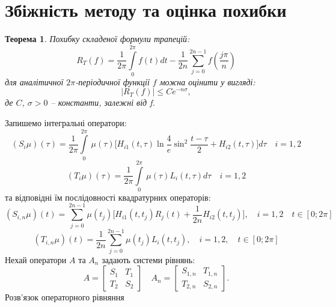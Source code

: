 \documentclass[a4 paper,12pt,ukrainian]{report}
\newtheorem{theorem}{\textbf{Теорема}}[chapter]
\begin{document}
\section*{Збіжність методу та оцінка похибки}
\begin{theorem}
Похибку складеної формули трапецій:
\begin{equation*}
R_{T}(f)=\frac{1}{2\pi}\int\limits_{0}^{2\pi}f(t)dt-\frac{1}{2n}\sum\limits_{j=0}^{2n-1}f(\frac{j\pi}{n})
\end{equation*}
для аналітичної $2\pi$-періодичної функції $f$ можна оцінити у вигляді:
\begin{equation*}
|R_{T}(f)|\le Ce^{-n\sigma},
\end{equation*}
де $C$, $\sigma>0$ -- константи, залежні від f. 
\end{theorem}
\hspace*{\parindent}Запишемо інтегральні оператори:
\begin{equation*}
(S_{i}\mu)(\tau)=\frac{1}{2\pi}\int\limits_{0}^{2\pi} \,\mu(\tau)\Big[H_{i1}(t,\tau)\ln{\frac{4}{e}\sin^2\frac{t-\tau}{2}}+H_{i2}(t,\tau)\Big]d\tau \quad i=1,2
\end{equation*}
\begin{equation*}
(T_{i}\mu)(\tau)=\frac{1}{2\pi}\int\limits_{0}^{2\pi} \,\mu(\tau)L_{i}(t,\tau)d\tau \quad i=1,2
\end{equation*}
та відповідні їм послідовності квадратурних операторів:
\begin{equation*}
(S_{i,n}\mu)(t)=\sum\limits_{j=0}^{2n-1} \mu(t_{j})\Big[H_{i1}(t,t_j)R_j(t)+\frac{1}{2n}H_{i2}(t,t_j)\Big], \quad i=1,2 \quad t\in[0;2\pi]
\end{equation*}
\begin{equation*}
(T_{i,n}\mu)(t)=\frac{1}{2n}\sum\limits_{j=0}^{2n-1}\mu(t_j)L_{i}(t,t_j), \quad i=1,2, \quad t\in[0;2\pi]
\end{equation*}
\hspace*{\parindent}Нехай оператори $A$ та $A_{n}$ задають системи рівнянь:
\begin{equation*}
A=\left[
\begin{array}{cc}
S_{1}&T_{1}\\
T_{2}&S_{2}
\end{array}
\right]\quad
A_{n}=\left[
\begin{array}{cc}
S_{1,n}&T_{1,n}\\
T_{2,n}&S_{2,n}
\end{array}
\right].
\end{equation*}
\hspace*{\parindent}Розв'язок операторного рівняння
\end{document}
